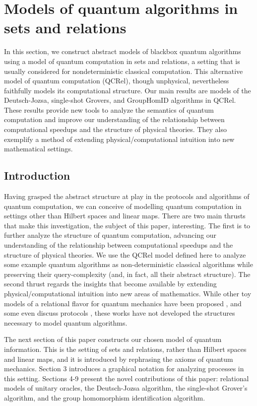 \section{\color{blue} Models of quantum algorithms in sets and relations}
\label{sec:qalgrel}

        In this section, we construct abstract models of blackbox quantum algorithms using a model of quantum computation in sets and relations, a setting that is usually considered for nondeterministic classical computation.  This alternative model of quantum computation (QCRel), though unphysical, nevertheless faithfully models its computational structure.  Our main results are models of the Deutsch-Jozsa, single-shot Grovers, and GroupHomID algorithms in QCRel. These results provide new tools to analyze the semantics of quantum computation and improve our understanding of the relationship between computational speedups and the structure of physical theories. They also exemplify a method of extending physical/computational intuition into new mathematical settings.

\subsection{Introduction}

Having grasped the abstract structure at play in the protocols and algorithms of quantum computation, we can conceive of modelling quantum computation in settings other than Hilbert spaces and linear maps.  There are two main thrusts that make this investigation, the subject of this paper, interesting.  The first is to further analyze the structure of quantum computation, advancing our understanding of the relationship between computational speedups and the structure of physical theories. We use the QCRel model defined here to analyze some example quantum algorithms as non-deterministic classical algorithms while preserving their query-complexity (and, in fact, all their abstract structure). The second thrust regards the insights that become available by extending physical/computational intuition into new areas of mathematics. While other toy models of a relational flavor for quantum mechanics have been proposed \cite{ellermanModelQM,discreteQT,modalQT,spekk}, and some even discuss protocols \cite{QCFF_James}, these works have not developed the structures necessary to model quantum algorithms.

The next section of this paper constructs our chosen model of quantum information.  This is the setting of sets and relations, rather than Hilbert spaces and linear maps, and it is introduced by rephrasing the axioms of quantum mechanics. Section 3 introduces a graphical notation for analyzing processes in this setting. Sections 4-9 present the novel contributions of this paper: relational models of unitary oracles, the Deutsch-Jozsa algorithm, the single-shot Grover's algorithm, and the group homomorphism identification algorithm.


